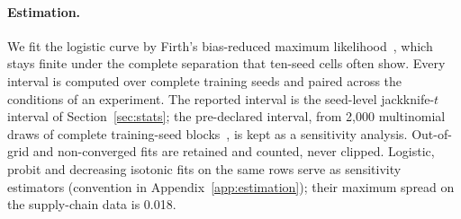 \paragraph{Estimation.}
We fit the logistic curve by Firth's bias-reduced maximum likelihood~\citep{firth1993}, which stays finite
under the complete separation that ten-seed cells often show. Every interval is computed over complete training
seeds and paired across the conditions of an experiment. The reported interval is the seed-level jackknife-$t$
interval of Section~\ref{sec:stats}; the pre-declared interval, from 2,000 multinomial draws of complete training-seed
blocks~\citep{efron1993bootstrap}, is kept as a sensitivity analysis. Out-of-grid and non-converged fits are retained
and counted, never clipped. Logistic, probit and decreasing isotonic fits on the same rows serve as sensitivity
estimators (convention in Appendix~\ref{app:estimation}); their maximum spread on the supply-chain data
is 0.018.

